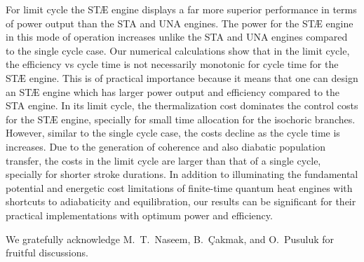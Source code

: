 \documentclass[aps,pra,twocolumn,showpacs,showkeys,groupedaddress,nobalancelastpage,nofootinbib,floatfix,superscriptaddress,longbibliography]{revtex4-2}
\begin{document}
For limit cycle the ST{\AE} engine displays a far more superior performance in terms of power output than the STA and UNA engines. The power for the ST{\AE} engine in this mode of operation increases unlike the STA and UNA engines compared to the single cycle case. Our numerical calculations show that in the limit cycle, the efficiency vs cycle time is not necessarily monotonic for cycle time for the ST{\AE}
engine. This is of practical importance because it means that one can design an ST{\AE} engine which has larger power output and efficiency compared to the STA engine. In its limit cycle, the thermalization cost dominates the control costs for the ST{\AE} engine, specially for small time allocation for the isochoric branches. However, similar to the single cycle case, the costs decline as the cycle time is increases. Due to the generation of coherence and also diabatic population transfer, the costs in the limit cycle are larger than that of a single cycle, specially for shorter stroke durations. In addition to illuminating the fundamental potential and energetic cost limitations of finite-time quantum heat engines with shortcuts to adiabaticity and equilibration, our results can be significant for their practical implementations with optimum power and efficiency.

\acknowledgements

We gratefully acknowledge M.~T.~Naseem, B.~Çakmak, and O.~Pusuluk for fruitful discussions.

%
%

\end{document}
